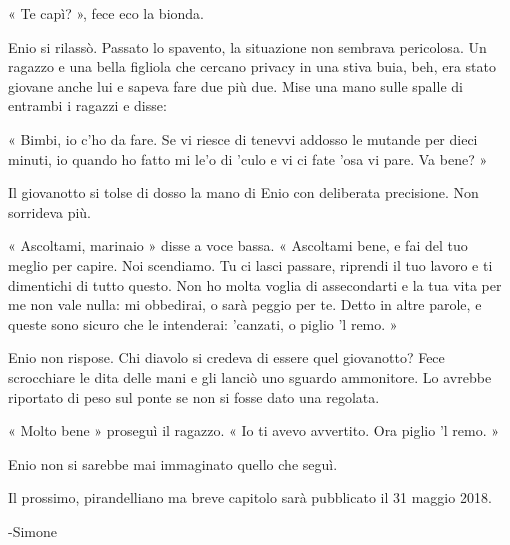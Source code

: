« Te capì? », fece eco la bionda.

Enio si rilassò. Passato lo spavento, la situazione non sembrava pericolosa. Un ragazzo e una bella figliola che cercano privacy in una stiva buia, beh, era stato giovane anche lui e sapeva fare due più due. Mise una mano sulle spalle di entrambi i ragazzi e disse:

« Bimbi, io c'ho da fare. Se vi riesce di tenevvi addosso le mutande per dieci minuti, io quando ho fatto mi le'o di 'culo e vi ci fate 'osa vi pare. Va bene? »

Il giovanotto si tolse di dosso la mano di Enio con deliberata precisione. Non sorrideva più.

« Ascoltami, marinaio » disse a voce bassa. « Ascoltami bene, e fai del tuo meglio per capire. Noi scendiamo. Tu ci lasci passare, riprendi il tuo lavoro e ti dimentichi di tutto questo. Non ho molta voglia di assecondarti e la tua vita per me non vale nulla: mi obbedirai, o sarà peggio per te. Detto in altre parole, e queste sono sicuro che le intenderai: 'canzati, o piglio 'l remo. »

Enio non rispose. Chi diavolo si credeva di essere quel giovanotto? Fece scrocchiare le dita delle mani e gli lanciò uno sguardo ammonitore. Lo avrebbe riportato di peso sul ponte se non si fosse dato una regolata.

« Molto bene » proseguì il ragazzo. « Io ti avevo avvertito. Ora piglio 'l remo. »

Enio non si sarebbe mai immaginato quello che seguì.

Il prossimo, pirandelliano ma breve capitolo sarà pubblicato il 31 maggio 2018.

-Simone



